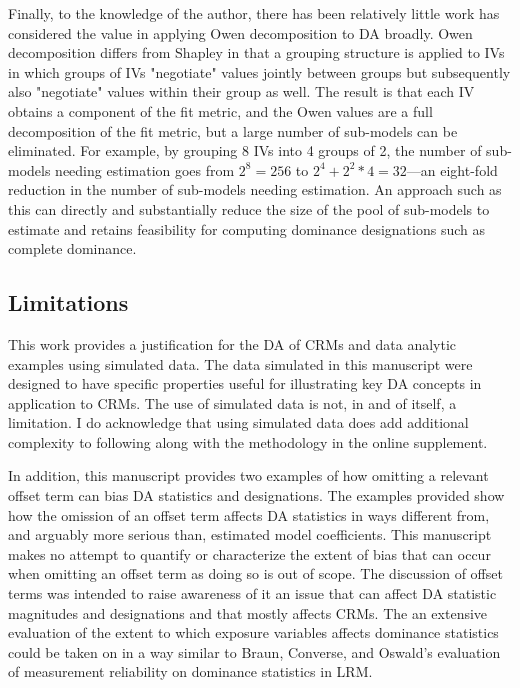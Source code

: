 \documentclass[ShortAfour,times,sageapa]{sagej}
\begin{document}
	Finally, to the knowledge of the author, there has been relatively little work has considered the value in applying Owen decomposition \cite[e.g.,]{huettner2012axiomatic} to DA broadly.
	Owen decomposition differs from Shapley in that a grouping structure is applied to IVs in which groups of IVs "negotiate" values jointly between groups but subsequently also "negotiate" values within their group as well. 
	The result is that each IV obtains a component of the fit metric, and the Owen values are a full decomposition of the fit metric, but a large number of sub-models can be eliminated. 
	For example, by grouping 8 IVs into 4 groups of 2, the number of sub-models needing estimation goes from $2^8 = 256$ to $2^4 + 2^2*4 = 32$---an eight-fold reduction in the number of sub-models needing estimation.
	An approach such as this can directly and substantially reduce the size of the pool of sub-models to estimate and retains feasibility for computing dominance designations such as complete dominance.	
	
	\subsection{Limitations}
	
	This work provides a justification for the DA of CRMs and data analytic examples using simulated data.
	The data simulated in this manuscript were designed to have specific properties useful for illustrating key DA concepts in application to CRMs.
	The use of simulated data is not, in and of itself, a limitation.
	I do acknowledge that using simulated data does add additional complexity to following along with the methodology in the online supplement.
	
	In addition, this manuscript provides two examples of how omitting a relevant offset term can bias DA statistics and designations.
	The examples provided show how the omission of an offset term affects DA statistics in ways different from, and arguably more serious than, estimated model coefficients.
	This manuscript makes no attempt to quantify or characterize the extent of bias that can occur when omitting an offset term as doing so is out of scope.
	The discussion of offset terms was intended to raise awareness of it an issue that can affect DA statistic magnitudes and designations and that mostly affects CRMs.
	The an extensive evaluation of the extent to which exposure variables affects dominance statistics could be taken on in a way similar to Braun, Converse, and Oswald's \cite{braun2019accuracy} evaluation of measurement reliability on dominance statistics in LRM.
	
\end{document}
